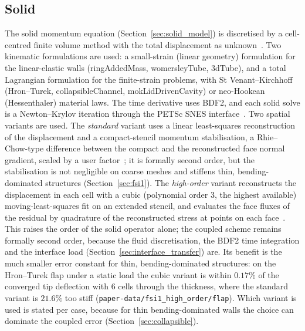 \subsection{Solid}\label{sec:solid_solver}

The solid momentum equation (Section~\ref{sec:solid_model}) is discretised by a cell-centred finite volume method with the total displacement as unknown~\citep{Jasak2000, Cardiff2021}.
Two kinematic formulations are used: a small-strain (linear geometry) formulation for the linear-elastic walls (ringAddedMass, womersleyTube, 3dTube), and a total Lagrangian formulation for the finite-strain problems, with St Venant--Kirchhoff (Hron--Turek, collapsibleChannel, mokLidDrivenCavity) or neo-Hookean (Hessenthaler) material laws.
The time derivative uses BDF2, and each solid solve is a Newton--Krylov iteration through the PETSc SNES interface~\citep{PETSc, Cardiff2026}.
Two spatial variants are used.
The \emph{standard} variant uses a linear least-squares reconstruction of the displacement and a compact-stencil momentum stabilisation, a Rhie--Chow-type difference between the compact and the reconstructed face normal gradient, scaled by a user factor~\citep{Cardiff2026}; it is formally second order, but the stabilisation is not negligible on coarse meshes and stiffens thin, bending-dominated structures (Section~\ref{sec:fsi1}).
The \emph{high-order} variant reconstructs the displacement in each cell with a cubic (polynomial order 3, the highest available) moving-least-squares fit on an extended stencil, and evaluates the face fluxes of the residual by quadrature of the reconstructed stress at points on each face~\citep{Batistic2026}.
This raises the order of the solid operator alone; the coupled scheme remains formally second order, because the fluid discretisation, the BDF2 time integration and the interface load (Section~\ref{sec:interface_transfer}) are.
Its benefit is the much smaller error constant for thin, bending-dominated structures: on the Hron--Turek flap under a static load the cubic variant is within $0.17\%$ of the converged tip deflection with 6 cells through the thickness, where the standard variant is $21.6\%$ too stiff (\texttt{paper-data/fsi1\_high\_order/flap}).
Which variant is used is stated per case, because for thin bending-dominated walls the choice can dominate the coupled error (Section~\ref{sec:collapsible}).

